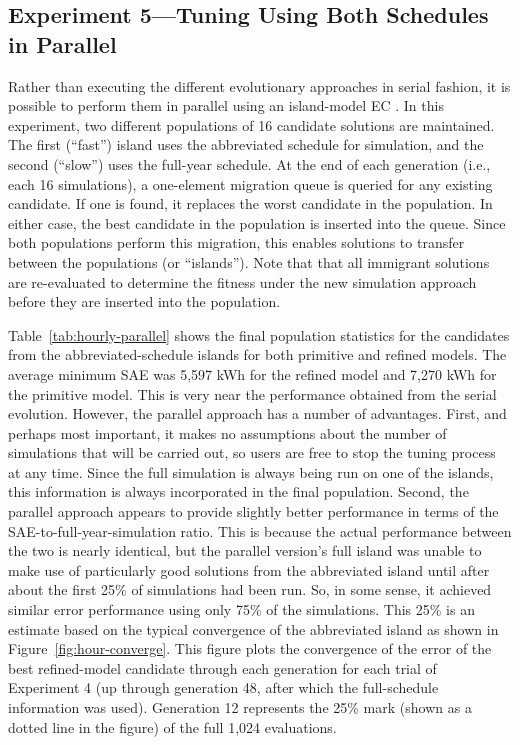 \documentclass[preprint, review, 12pt]{elsarticle}
\begin{document}
{\subsection{Experiment 5---Tuning Using Both Schedules in Parallel}
\label{sub:experiment5}
Rather than executing the different evolutionary approaches in serial fashion, it is possible to perform them in parallel using an island-model EC \cite{cit:eiben2007}. In this experiment, two different populations of 16 candidate solutions are maintained. The first (``fast'') island uses the abbreviated schedule for simulation, and the second (``slow'') uses the full-year schedule. At the end of each generation (i.e., each 16 simulations), a one-element migration queue is queried for any existing candidate. If one is found, it replaces the worst candidate in the population. In either case, the best candidate in the population is inserted into the queue. Since both populations perform this migration, this enables solutions to transfer between the populations (or ``islands''). Note that that all immigrant solutions are re-evaluated to determine the fitness under the new simulation approach before they are inserted into the population.

Table~\ref{tab:hourly-parallel} shows the final population statistics for the candidates from the abbreviated-schedule islands for both primitive and refined models. The average minimum SAE was 5,597 kWh for the refined model and 7,270 kWh for the primitive model. This is very near the performance obtained from the serial evolution. However, the parallel approach has a number of advantages. First, and perhaps most important, it makes no assumptions about the number of simulations that will be carried out, so users are free to stop the tuning process at any time. Since the full simulation is always being run on one of the islands, this information is always incorporated in the final population. Second, the parallel approach appears to provide slightly better performance in terms of the SAE-to-full-year-simulation ratio. This is because the actual performance between the two is nearly identical, but the parallel version's full island was unable to make use of particularly good solutions from the abbreviated island until after about the first 25\% of simulations had been run. So, in some sense, it achieved similar error performance using only 75\% of the simulations. This 25\% is an estimate based on the typical convergence of the abbreviated island as shown in Figure~\ref{fig:hour-converge}. This figure plots the convergence of the error of the best refined-model candidate through each generation for each trial of Experiment 4 (up through generation 48, after which the full-schedule information was used). Generation 12 represents the 25\% mark (shown as a dotted line in the figure) of the full 1,024 evaluations.

}
\end{document}

